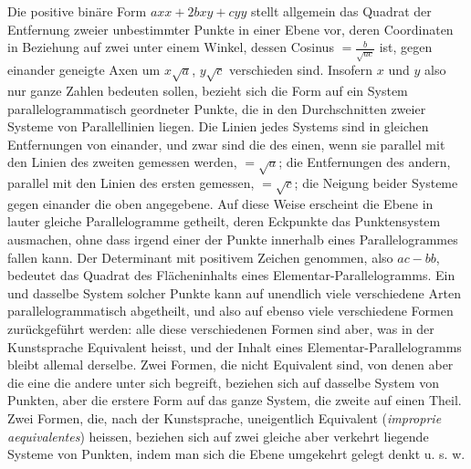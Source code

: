 \documentclass[12pt]{article}
\begin{document}
Die positive binäre Form $axx+2bxy+cyy$ stellt allgemein das Quadrat der Entfernung zweier unbestimmter Punkte in einer Ebene vor, deren Coordinaten in Beziehung auf zwei unter einem Winkel, dessen Cosinus $=\frac{b}{\sqrt{ac}}$ ist, gegen einander geneigte Axen um $x\sqrt{a}$, $y\sqrt{c}$ verschieden sind. Insofern $x$ und $y$ also nur ganze Zahlen bedeuten sollen, bezieht sich die Form auf ein System parallelogrammatisch geordneter Punkte, die in den Durchschnitten zweier Systeme von Parallellinien liegen. Die Linien jedes Systems sind in gleichen Entfernungen von einander, und zwar sind die des einen, wenn sie parallel mit den Linien des zweiten gemessen werden, $=\sqrt{a}$; die Entfernungen des andern, parallel mit den Linien des ersten gemessen, $=\sqrt{c}$; die Neigung beider Systeme gegen einander die oben angegebene. Auf diese Weise erscheint die Ebene in lauter gleiche Parallelogramme getheilt, deren Eckpunkte das Punktensystem ausmachen, ohne dass irgend einer der Punkte innerhalb eines Parallelogrammes fallen kann. Der Determinant mit positivem Zeichen genommen, also $ac-bb$, bedeutet das Quadrat des Flächeninhalts eines Elementar-Parallelogramms. Ein und dasselbe System solcher Punkte kann auf unendlich viele verschiedene Arten parallelogrammatisch abgetheilt, und also auf ebenso viele verschiedene Formen zurückgeführt werden: alle diese verschiedenen Formen sind aber, was in der Kunstsprache Equivalent heisst, und der Inhalt eines Elementar-Parallelogramms bleibt allemal derselbe. Zwei Formen, die nicht Equivalent sind, von denen aber die eine die andere unter sich begreift, beziehen sich auf dasselbe System von Punkten, aber die erstere Form auf das ganze System, die zweite auf einen Theil. Zwei Formen, die, nach der Kunstsprache, uneigentlich Equivalent (\textit{improprie aequivalentes}) heissen, beziehen sich auf zwei gleiche aber verkehrt liegende Systeme von Punkten, indem man sich die Ebene umgekehrt gelegt denkt u. s. w.
\end{document}
